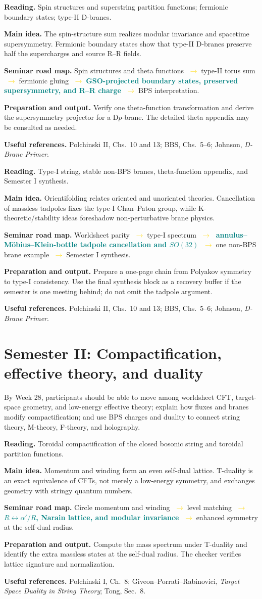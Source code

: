 \documentclass[11pt]{article}
\newcommand{\essential}[1]{\textcolor{teal}{\textbf{#1}}}
\newcommand{\roadarrow}{\textcolor{gold}{\ensuremath{\;\longrightarrow\;}}}
\newcommand{\seminarweek}[7]{%
  \begin{tcolorbox}[
    enhanced,
    colback=white,colframe=navy,
    boxrule=0.65pt,arc=1.5mm,
    left=3mm,right=3mm,top=2mm,bottom=2mm,
    title={#1\hfill\normalfont #2},
    fonttitle=\bfseries,coltitle=white,colbacktitle=navy
  ]
  \textbf{Reading.} #3

  \textbf{Main idea.} #4

  \textbf{Seminar road map.} #5

  \textbf{Preparation and output.} #6

  \textbf{Useful references.} #7
  \end{tcolorbox}
}
\begin{document}
\seminarweek{Week 13}{Ch.~9.1--9.3, pp.~223--240}
{Spin structures and superstring partition functions; fermionic boundary
states; type-II D-branes.}
{The spin-structure sum realizes modular invariance and spacetime
supersymmetry.  Fermionic boundary states show that type-II D-branes preserve
half the supercharges and source R--R fields.}
{Spin structures and theta functions \roadarrow type-II torus sum
\roadarrow fermionic gluing \roadarrow \essential{GSO-projected boundary
states, preserved supersymmetry, and R--R charge} \roadarrow BPS interpretation.}
{Verify one theta-function transformation and derive the supersymmetry projector
for a D$p$-brane.  The detailed theta appendix may be consulted as needed.}
{Polchinski II, Chs.~10 and 13; BBS, Chs.~5--6; Johnson,
\emph{D-Brane Primer}.}

\seminarweek{Week 14}{Ch.~9.4--9.6, pp.~241--262}
{Type-I string, stable non-BPS branes, theta-function appendix, and Semester I
synthesis.}
{Orientifolding relates oriented and unoriented theories.  Cancellation of
massless tadpoles fixes the type-I Chan--Paton group, while K-theoretic/stability
ideas foreshadow non-perturbative brane physics.}
{Worldsheet parity \roadarrow type-I spectrum \roadarrow
\essential{annulus--M\"obius--Klein-bottle tadpole cancellation and $SO(32)$}
\roadarrow one non-BPS brane example \roadarrow Semester I synthesis.}
{Prepare a one-page chain from Polyakov symmetry to type-I consistency.  Use
the final synthesis block as a recovery buffer if the semester is one meeting
behind; do not omit the tadpole argument.}
{Polchinski II, Chs.~10 and 13; BBS, Chs.~5--6; Johnson,
\emph{D-Brane Primer}.}

\clearpage
\section{Semester II: Compactification, effective theory, and duality}

\begin{keybox}
By Week 28, participants should be able to move among worldsheet CFT, target-space
geometry, and low-energy effective theory; explain how fluxes and branes modify
compactification; and use BPS charges and duality to connect string theory,
M-theory, F-theory, and holography.
\end{keybox}

\seminarweek{Week 15}{Ch.~10.1--10.3, pp.~263--283}
{Toroidal compactification of the closed bosonic string and toroidal partition
functions.}
{Momentum and winding form an even self-dual lattice.  T-duality is an exact
equivalence of CFTs, not merely a low-energy symmetry, and exchanges geometry
with stringy quantum numbers.}
{Circle momentum and winding \roadarrow level matching \roadarrow
\essential{$R\leftrightarrow\alpha'/R$, Narain lattice, and modular invariance}
\roadarrow enhanced symmetry at the self-dual radius.}
{Compute the mass spectrum under T-duality and identify the extra massless
states at the self-dual radius.  The checker verifies lattice signature and
normalization.}
{Polchinski I, Ch.~8; Giveon--Porrati--Rabinovici, \emph{Target Space Duality in
String Theory}; Tong, Sec.~8.}
\end{document}
